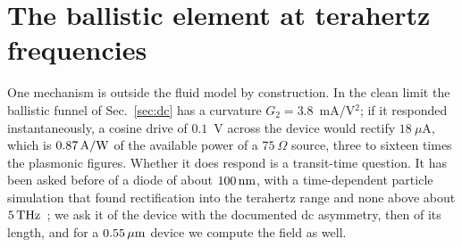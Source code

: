 \section{The ballistic element at terahertz frequencies}
\label{sec:ballistic}

One mechanism is outside the fluid model by construction. In the clean
limit the ballistic funnel of Sec.~\ref{sec:dc} has a curvature
$G_{2}=3.8$~mA/V$^{2}$; if it responded instantaneously, a cosine drive of
$0.1$~V across the device would rectify $18\ \mu$A, which is $0.87\,\mathrm{A/W}$ of
the available power of a $75\ \Omega$ source, three to sixteen times the plasmonic
figures. Whether it does respond is a transit-time question. It has been
asked before of a diode of about $100\,\mathrm{nm}$, with a time-dependent particle
simulation that found rectification into the terahertz range and none
above about $5\,\mathrm{THz}$~\cite{stearns2020high}; we ask it of the device with
the documented dc asymmetry, then of its length, and for a $0.55\,\mu\mathrm{m}$
device we compute the field as well.

